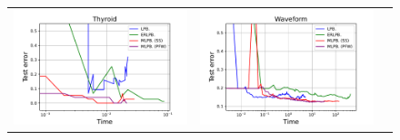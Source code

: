\begin{figure}[p]
\begin{tabular}{ccc}
\begin{minipage}[t]{0.31\hsize}
            \includegraphics[keepaspectratio, scale=0.30]
            {figure/test_logtime_thyroid.pdf}
        \end{minipage}
        &
        \begin{minipage}[t]{0.31\hsize}
            \centering
            \includegraphics[keepaspectratio, scale=0.30]
            {figure/test_logtime_waveform.pdf}
        \end{minipage}
        &
        \begin{minipage}[t]{0.31\hsize}
            \centering
            \includegraphics[keepaspectratio, scale=0.30]

\end{minipage}
\end{tabular}
\end{figure}
